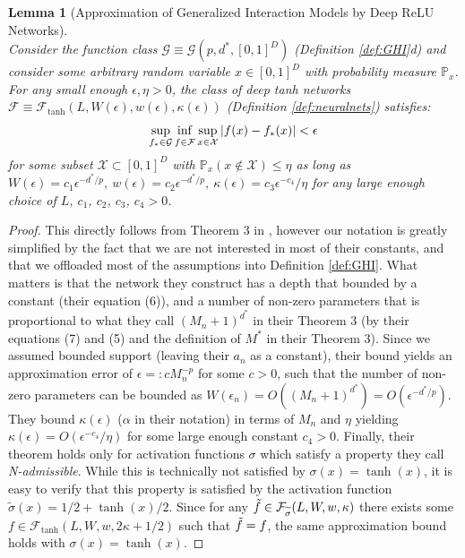 \documentclass[12pt]{article}
\newcommand{\newinf}{\mathop{\mathrm{inf}\vphantom{\mathrm{sup}}}}
\theoremstyle{myplain}
\newtheorem{lemma}{Lemma}[section]
\theoremstyle{definition}
\theoremstyle{definition}
\theoremstyle{remark}
\numberwithin{equation}{section}
\begin{document}
\begin{lemma}[Approximation of Generalized Interaction Models by Deep ReLU Networks]\label{lem:approxGHI}\ \\
Consider the function class $\mathcal{G}\equiv\mathcal{G}(p, d^{*}, [0,1]^D)$ (Definition \ref{def:GHI}d) and consider some arbitrary random variable $x\in [0,1]^D$ with probability measure $\mathbb{P}_x$. For any small enough $\epsilon, \eta>0$, the class of deep tanh networks $\mathcal{F}\equiv\mathcal{F}_{\tanh}(L, W(\epsilon), w(\epsilon), \kappa(\epsilon))$ (Definition \ref{def:neuralnets}) satisfies:
\[\sup_{f_*\in \mathcal{G}} \newinf_{f\in\mathcal{F}} \sup_{x\in {\mathcal{X}}} |f(x)-f_*(x)| < \epsilon\] for some subset ${\mathcal{X}}\subset[0,1]^D$ with $\mathbb{P}_x(x\not\in {\mathcal{X}})\leq\eta$ as long as $W(\epsilon) = c_1 \epsilon^{-d^{*}/ p },\ w(\epsilon) = c_2 \epsilon^{-d^{*}/ p },\ \kappa(\epsilon)=c_3 \epsilon^{-c_4}/\eta$ for any large enough choice of $L$, $c_1$, $c_2$, $c_3$, $c_4>0$. 

\end{lemma}
\begin{proof}
This directly follows from Theorem 3 in \cite{bauer2019deep}, however our notation is greatly simplified by the fact that we are not interested in most of their constants, and that we offloaded most of the assumptions into Definition \ref{def:GHI}. What matters is that the network they construct has a depth that bounded by a constant (their equation (6)), and a number of non-zero parameters that is proportional to what they call $(M_n+1)^{d^*}$ in their Theorem 3 (by their equations (7) and (5) and the definition of $M^*$ in their Theorem 3). Since we assumed bounded support (leaving their $a_n$ as a constant), their bound yields an approximation error of $\epsilon=: c M_n^{-p} $ for some $c>0$, such that the number of non-zero parameters can be bounded as $W(\epsilon_n)=O\left((M_n+1)^{d^*}\right)=O(\epsilon^{-d^*/p})$. They bound $\kappa(\epsilon)$ ($\alpha$ in their notation) in terms of $M_n$ and $\eta$ yielding $\kappa(\epsilon)=O(\epsilon^{-c_4}/\eta)$ for some large enough constant $c_4>0$. Finally, their theorem holds only for activation functions $\sigma$ which satisfy a property they call \textit{N-admissible}. While this is technically not satisfied by $\sigma(x)=\tanh{(x)}$, it is easy to verify that this property is satisfied by the activation function $\widetilde{\sigma}(x)=1/2+\tanh{(x)}/2$. Since for any $\Tilde{f}\in \mathcal{F}_{\widetilde{\sigma}} (L, W, w, \kappa)$ there exists some $f\in \mathcal{F}_{\tanh} (L, W, w, 2\kappa+1/2)$ such that $\Tilde{f}=f$, the same approximation bound holds with $\sigma(x)=\tanh{(x)}$. 
\end{proof}
\end{document}
